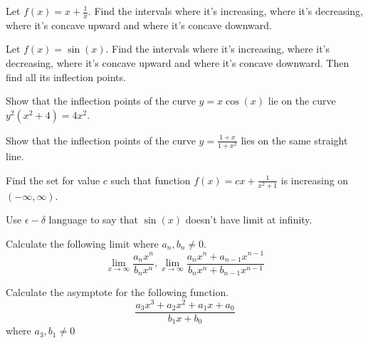 \documentclass[Calculus 1 Recitation.tex]{subfiles}
\begin{document}
\begin{myleftlinebox}
	Let $f(x)=x+\frac{1}{x}$. Find the intervals where it's increasing, where it's decreasing, where it's concave upward and where it's concave downward.
	\tcblower
	\vspace{2em}
\end{myleftlinebox}

\begin{myleftlinebox}
	Let $f(x)=\sin(x)$. Find the intervals where it's increasing, where it's decreasing, where it's concave upward and where it's concave downward. Then find all its inflection points.
	\tcblower
	\vspace{2em}
\end{myleftlinebox}

\begin{myleftlinebox}
	Show that the inflection points of the curve $y=x\cos (x)$ lie on the curve $y^2(x^2+4)=4x^2$.
	\tcblower
	\vspace{2em}	
\end{myleftlinebox}

\begin{myleftlinebox}
	Show that the inflection points of the curve $y=\frac{1+x}{1+x^2}$ lies on the same straight line.
	\tcblower
	\vspace{2em}	
\end{myleftlinebox}

\begin{myleftlinebox}
	Find the set for value $c$ such that function $f(x)=cx+\frac{1}{x^2+1}$ is increasing on $(-\infty,\infty)$.
	\tcblower
	\vspace{2em}	
\end{myleftlinebox}

\begin{myleftlinebox}
	Use $\epsilon-\delta$ language to say that $\sin(x)$ doesn't have limit at infinity.
	\tcblower
	\vspace{2em}
\end{myleftlinebox}

\begin{myleftlinebox}
	Calculate the following limit where $a_n,b_n\neq 0$.
	\[\lim_{x\to\infty}\frac{a_n x^n}{b_n x^n}, \lim_{x\to\infty}\frac{a_n x^n+a_{n-1} x^{n-1}}{b_n x^n+b_{n-1} x^{n-1}}\]
	\tcblower
	\vspace{2em}
\end{myleftlinebox}

\begin{myleftlinebox}
	Calculate the asymptote for the following function.
	\[\frac{a_3 x^3+a_2 x^2+a_1 x+a_0}{b_1 x+b_0}\]
	where $a_3,b_1\neq0$
	\tcblower
	\vspace{2em}
\end{myleftlinebox}
\end{document}
